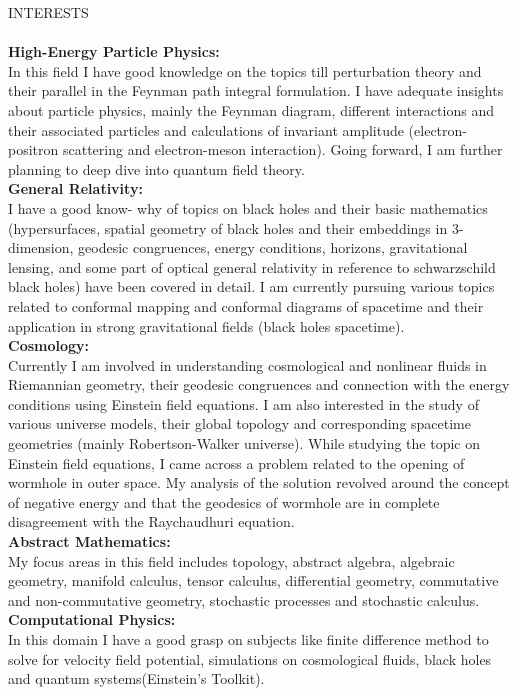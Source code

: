 \documentclass[a4paper]{article}
\newcommand{\lineunder} {
    \vspace*{-8pt} \\
    \hspace*{-18pt} \hrulefill \\
}
\newcommand{\header} [1] {
    {\hspace*{-18pt}\vspace*{6pt} \textsc{#1}}
    \vspace*{-6pt} \lineunder
}
\begin{document}
\vspace{2mm}
\newpage
\header{INTERESTS}
\textbf{High-Energy Particle Physics: }\\
In this field I have good knowledge on the topics till perturbation theory and their parallel in the Feynman path integral formulation. I have adequate insights about particle physics, mainly the Feynman diagram, different interactions and their associated particles and calculations of invariant amplitude (electron-positron scattering and electron-meson interaction). Going forward, I am further planning to deep dive into quantum field theory. \\
\vspace*{2mm}
\textbf{General Relativity: } \\
I have a good know- why of topics on black holes and their basic mathematics (hypersurfaces, spatial geometry of black holes and their embeddings in 3-dimension, geodesic congruences, energy conditions, horizons, gravitational lensing, and some part of optical general relativity in reference to schwarzschild black holes) have been covered in detail. I am currently pursuing various topics related to conformal mapping and conformal diagrams of spacetime and their application in strong gravitational fields (black holes spacetime). \\
\vspace*{2mm}
\textbf{Cosmology: }\\
Currently I am involved in understanding cosmological and nonlinear fluids in Riemannian geometry, their geodesic congruences and connection with the energy conditions using Einstein field equations. I am also interested in the study of various universe models, their global topology and corresponding spacetime geometries (mainly Robertson-Walker universe). While studying the topic on Einstein field equations, I came across a problem related to the opening of wormhole in outer space. My analysis of the solution revolved around the concept of  negative energy and that the geodesics of wormhole are in complete disagreement with the Raychaudhuri equation. \\
\vspace*{2mm}
\textbf{Abstract Mathematics: }\\
My focus areas in this field includes topology, abstract algebra, algebraic geometry, manifold calculus, tensor calculus, differential geometry, commutative and non-commutative geometry, stochastic processes and stochastic calculus. \\
\vspace*{2mm}
\textbf{Computational Physics: }\\
In this domain I have a good grasp on subjects like finite difference method to solve for velocity field potential, simulations on cosmological fluids, black holes and quantum systems(Einstein’s Toolkit). \\
\vspace{2mm}
\end{document}
